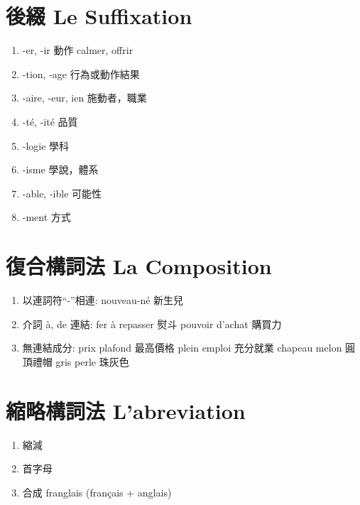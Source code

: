 \documentclass{book}
\begin{document}
    \section{後綴 Le Suffixation}
        \begin{enumerate}
            \item -er, -ir 動作 calmer, offrir
            \item -tion, -age 行為或動作結果
            \item -aire, -eur, ien 施動者，職業
            \item -té, -ité 品質
            \item -logie 學科
            \item -isme 學說，體系
            \item -able, -ible 可能性
            \item -ment 方式
        \end{enumerate}

    \section{復合構詞法 La Composition}
        \begin{enumerate}
            \item 以連詞符``-''相連: nouveau-né 新生兒
            \item 介詞 à, de 連結: fer à repasser 熨斗 pouvoir d'achat 購買力
            \item 無連結成分: prix plafond 最高價格 plein emploi 充分就業 chapeau melon 圓頂禮帽 gris perle 珠灰色
        \end{enumerate}

    \section{縮略構詞法 L'abreviation}
        \begin{enumerate}
            \item 縮減
            \item 首字母
            \item 合成 franglais (français + anglais)
        \end{enumerate}
\end{document}
